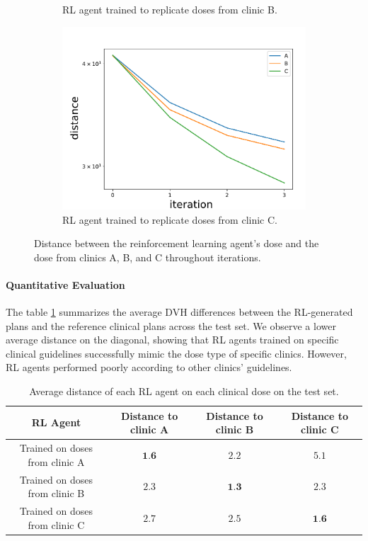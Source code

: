 \begin{figure}
\begin{subfigure}{0.32\linewidth}
		\caption{RL agent trained to replicate doses from clinic B.}
		\label{fig:RL_clinic_B}
	\end{subfigure}
	\hfill
	\begin{subfigure}{0.32\linewidth}
		\centering
		\includegraphics[width=\linewidth]{ASTRO/distanceC_semilogy.pdf}
		\caption{RL agent trained to replicate doses from clinic C.}
		\label{fig:RL_clinic_C}
	\end{subfigure}
	\caption{
		Distance between the reinforcement learning agent’s dose and the dose from clinics A, B, and C throughout iterations.
	}
	\label{fig:RL_clinics}
\end{figure}

\paragraph{Quantitative Evaluation}
The table \ref{table:performances_RL_clinics} summarizes the average DVH differences between the RL-generated plans and the reference clinical plans across the test set.
We observe a lower average distance on the diagonal, showing that RL agents trained on specific clinical guidelines successfully mimic the dose type of specific clinics.
However, RL agents performed poorly according to other clinics' guidelines.
\begin{table}
	\begin{center}
		\begin{tabular}{| c | c | c | c |} 
			\hline
			RL Agent & Distance to clinic A & Distance to clinic B & Distance to clinic C \\ 
			\hline
			Trained on doses from clinic A & $\textbf{1.6}$ & $2.2$ & $5.1$ \\
			\hline
			Trained on doses from clinic B & $2.3$ & $\textbf{1.3}$ & $2.3$ \\
			\hline
			Trained on doses from clinic C & $2.7$ & $2.5$ & $\textbf{1.6}$ \\
			\hline
		\end{tabular}
	\end{center}
	\caption{Average distance of each RL agent on each clinical dose on the test set.}
	\label{table:performances_RL_clinics}
\end{table}

